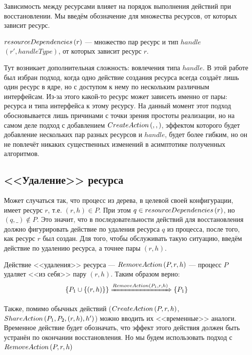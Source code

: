 Зависимость между ресурсами влияет на порядок выполнения действий при восстановлении. Мы введём обозначение для множества ресурсов, от которых зависит ресурс.

\begin{defn}
\label{def:dependsprop}
$resourceDependencies\left( r \right)$ --- множество пар ресурс и тип $handle$ $(r', handleType)$, от которых зависит ресурс $r$.
\end{defn}

Тут возникает дополнительная сложность: вовлечения типа $handle$. В этой работе был избран подход, когда одно действие
создания ресурса всегда создаёт лишь один ресурс в ядре, но с доступом к нему по нескольким различным интерфейсам.
Из-за этого какой-то ресурс может зависеть именно от пары: ресурса и типа интерфейса к этому ресурсу. На данный момент этот подход обосновывается лишь причинами с точки зрения простоты реализации, но на самом деле подход с добавлением 
$CreateAction\left( , ,  \right)$, эффектом которого будет добавление нескольких пар разных ресурсов и $handle$, будет более гибким, но он не повлечёт никаких существенных изменений в асимптотике полученных алгоритмов.

\subsection{<<Удаление>> ресурса}

Может случаться так, что процесс из дерева, в целевой своей конфигурации, имеет ресурс $r$, т.е. $(r, h) \in P$. При этом $q \in resourceDependencies\left( r \right)$, но $(q, \_) \notin P$. Это значит, что в последовательности действий для восстановления должно фигурировать действие по удаления ресурса $q$ из процесса, после того, как ресурс $r$ был создан. Для того, чтобы обслуживать такую ситуацию, введём действие по удалению ресурса, а точнее пары $(r, h)$.

\begin{defn}
\label{def:removeact}
Действие <<удаления>> ресурса --- $RemoveAction\left( P, r, h \right)$ --- процесс $P$ удаляет <<из себя>> пару $(r, h)$. Таким образом верно:
\begin{equation*}
	\left\lbrace P_1 \cup \left\lbrace (r, h) \right\rbrace \right\rbrace \xRightarrow{RemoveAction\left( P_1, r, h \right)} \left\lbrace P_1 \right\rbrace
\end{equation*}
\end{defn}

\begin{note}
Также, помимо обычных действий ($CreateAction\left( P, r, h \right)$, $ShareAction\left( P_1, P_2, (r, h), h' \right)$) можно вводить их <<временные>> аналоги. Временное действие будет обозначать, что эффект этого действия должен быть устранён по окончании восстановления. Но мы будем использовать подход с \\ $RemoveAction\left( P, r, h \right)$
\end{note}

